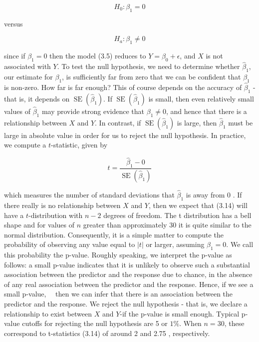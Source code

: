 \documentclass[10pt]{article}
\begin{document}
$$
H_{0}: \beta_{1}=0
$$

versus

$$
H_{a}: \beta_{1} \neq 0
$$

since if $\beta_{1}=0$ then the model (3.5) reduces to $Y=\beta_{0}+\epsilon$, and $X$ is not associated with $Y$. To test the null hypothesis, we need to determine whether $\hat{\beta}_{1}$, our estimate for $\beta_{1}$, is sufficiently far from zero that we can be confident that $\beta_{1}$ is non-zero. How far is far enough? This of course depends on the accuracy of $\hat{\beta}_{1}$ - that is, it depends on $\operatorname{SE}\left(\hat{\beta}_{1}\right)$. If $\operatorname{SE}\left(\hat{\beta}_{1}\right)$ is small, then even relatively small values of $\hat{\beta}_{1}$ may provide strong evidence that $\beta_{1} \neq 0$, and hence that there is a relationship between $X$ and $Y$. In contrast, if $\operatorname{SE}\left(\hat{\beta}_{1}\right)$ is large, then $\hat{\beta}_{1}$ must be large in absolute value in order for us to reject the null hypothesis. In practice, we compute a $t$-statistic, given by


\begin{equation*}
t=\frac{\hat{\beta}_{1}-0}{\operatorname{SE}\left(\hat{\beta}_{1}\right)} \tag{3.14}
\end{equation*}


which measures the number of standard deviations that $\hat{\beta}_{1}$ is away from 0 . If there really is no relationship between $X$ and $Y$, then we expect that (3.14) will have a $t$-distribution with $n-2$ degrees of freedom. The t distribution has a bell shape and for values of $n$ greater than approximately 30 it is quite similar to the normal distribution. Consequently, it is a simple matter to compute the probability of observing any value equal to $|t|$ or larger, assuming $\beta_{1}=0$. We call this probability the p-value. Roughly speaking, we interpret the p-value as follows: a small p-value indicates that it is unlikely to observe such a substantial association between the predictor and the response due to chance, in the absence of any real association between the predictor and the response. Hence, if we see a small p-value,\
\
then we can infer that there is an association between the predictor and the response. We reject the null hypothesis - that is, we declare a relationship to exist between $X$ and $Y$-if the p-value is small enough. Typical p-value cutoffs for rejecting the null hypothesis are 5 or $1 \%$. When $n=30$, these correspond to t-statistics (3.14) of around 2 and 2.75 , respectively.
\end{document}
